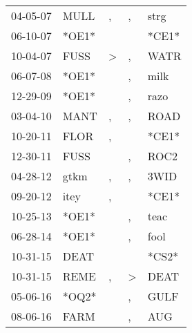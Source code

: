 \begin{supertabular}{p{0.07\textwidth}p{0.06\textwidth}p{0.02\textwidth}p{0.02\textwidth}p{0.06\textwidth}}
 04-05-07\textsuperscript{} &           MULL\textsuperscript{} &             , &             , &           strg\textsuperscript{} \\
 06-10-07\textsuperscript{} &                            *OE1* &               &               &                            *CE1* \\
 10-04-07\textsuperscript{} &           FUSS\textsuperscript{} &  \textgreater &             , &           WATR\textsuperscript{} \\
 06-07-08\textsuperscript{} &                            *OE1* &               &             , &           milk\textsuperscript{} \\
 12-29-09\textsuperscript{} &                            *OE1* &               &             , &           razo\textsuperscript{} \\
 03-04-10\textsuperscript{} &           MANT\textsuperscript{} &             , &             , &           ROAD\textsuperscript{} \\
 10-20-11\textsuperscript{} &           FLOR\textsuperscript{} &             , &               &                            *CE1* \\
 12-30-11\textsuperscript{} &           FUSS\textsuperscript{} &               &             , &           ROC2\textsuperscript{} \\
 04-28-12\textsuperscript{} &           gtkm\textsuperscript{} &             , &             , &           3WID\textsuperscript{} \\
 09-20-12\textsuperscript{} &           itey\textsuperscript{} &             , &               &                            *CE1* \\
 10-25-13\textsuperscript{} &                            *OE1* &               &             , &           teac\textsuperscript{} \\
 06-28-14\textsuperscript{} &                            *OE1* &               &             , &           fool\textsuperscript{} \\
 10-31-15\textsuperscript{} &           DEAT\textsuperscript{} &               &               &                            *CS2* \\
 10-31-15\textsuperscript{} &           REME\textsuperscript{} &             , &  \textgreater &           DEAT\textsuperscript{} \\
 05-06-16\textsuperscript{} &                            *OQ2* &               &             , &           GULF\textsuperscript{} \\
 08-06-16\textsuperscript{} &           FARM\textsuperscript{} &               &             , &            AUG\textsuperscript{} \\

\end{supertabular}

